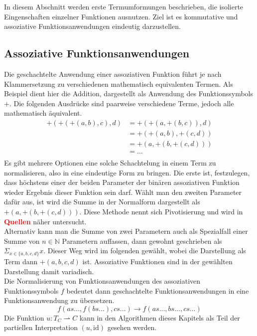 \documentclass{article}
\begin{document}
In diesem Abschnitt werden erste Termumformungen beschrieben, die isolierte Eingenschaften einzelner Funktionen ausnutzen. Ziel ist es kommutative und assoziative Funktionsanwendungen eindeutig darzustellen.\\

\subsection {Assoziative Funktionsanwendungen}
Die geschachtelte Anwendung einer assoziativen Funktion führt je nach Klammersetzung zu verschiedenen mathematisch equivalenten Termen. Als Beispiel dient hier die Addition, dargestellt als Anwendung des Funktionssymbols $+$. Die folgenden Ausdrücke sind paarweise verschiedene Terme, jedoch alle mathematisch äquivalent.
\begin{equation*}
	\begin{split}
	+(+(+(a, b), c), d) &= +(+(a, +(b, c)), d)\\
	&= +(+(a, b), +(c, d))\\
	&= +(a, +(b, +(c, d)))\\
	&= \dots \\
	\end{split}
\end{equation*}
Es gibt mehrere Optionen eine solche Schachtelung in einem Term zu normalisieren, also in eine eindeutige Form zu bringen. Die erste ist, festzulegen, dass höchstens einer der beiden Parameter der binären assoziativen Funktion wieder Ergebnis dieser Funktion sein darf. Wählt man den zweiten Parameter dafür aus, ist wird die Summe in der Normalform dargestellt als $+(a, +(b, +(c, d)))$. Diese Methode nennt sich Pivotisierung und wird in \textcolor{red}{\textbf{Quellen}} näher untersucht.\\
Alternativ kann man die Summe von zwei Parametern auch als Spezialfall einer Summe von $n \in \mathbb{N}$ Parametern auffassen, dann gewohnt geschrieben als $\Sigma_{x \in \{a, b, c, d\}} x$. Dieser Weg wird im folgenden gewählt, wobei die Darstellung als Term dann $+(a, b, c, d)$ ist. Assoziative Funktionen sind in der gewählten Darstellung damit variadisch. \\
Die Normalisierung von Funktionsanwendungen des assoziativen Funktionssymbols $f$ bedeutet dann geschachtelte Funktionsanwendungen in eine Funktionsanwendung zu übersetzen. 
$$f(as..., f(bs...), cs...) \rightarrow f(as..., bs..., cs...)$$
Die Funktion $u \colon T_C \rightharpoonup C$ kann in den Algorithmen dieses Kapitels als Teil der partiellen Interpretation $(u, \mathrm{id})$ gesehen werden. 
\end{document}
